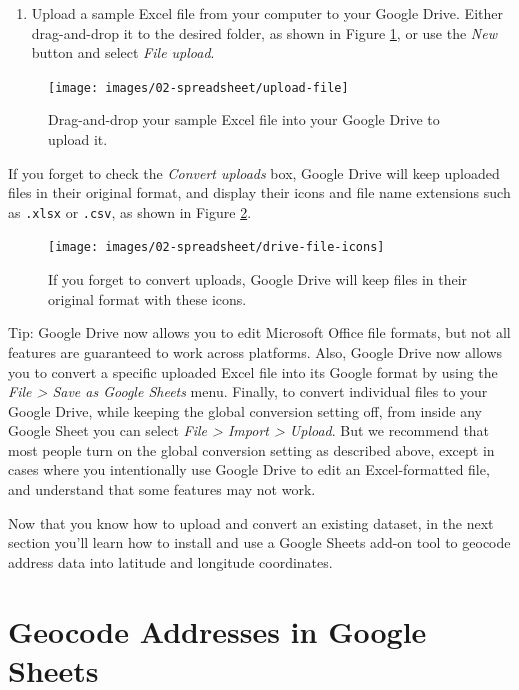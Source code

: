 \documentclass[
  english,
]{book}
\providecommand{\tightlist}{%
  \setlength{\itemsep}{0pt}\setlength{\parskip}{0pt}}
\begin{document}
\begin{enumerate}
\def\labelenumi{\arabic{enumi}.}
\setcounter{enumi}{3}
\tightlist
\item
  Upload a sample Excel file from your computer to your Google Drive. Either drag-and-drop it to the desired folder, as shown in Figure \ref{fig:upload-file}, or use the \emph{New} button and select \emph{File upload}.
\end{enumerate}



\begin{figure}
\texttt{[image: images/02-spreadsheet/upload-file]} \caption{Drag-and-drop your sample Excel file into your Google Drive to upload it.}\label{fig:upload-file}
\end{figure}

If you forget to check the \emph{Convert uploads} box, Google Drive will keep uploaded files in their original format, and display their icons and file name extensions such as \texttt{.xlsx} or \texttt{.csv}, as shown in Figure \ref{fig:drive-file-icons}.



\begin{figure}
\texttt{[image: images/02-spreadsheet/drive-file-icons]} \caption{If you forget to convert uploads, Google Drive will keep files in their original format with these icons.}\label{fig:drive-file-icons}
\end{figure}

Tip: Google Drive now allows you to edit Microsoft Office file formats, but not all features are guaranteed to work across platforms. Also, Google Drive now allows you to convert a specific uploaded Excel file into its Google format by using the \emph{File \textgreater{} Save as Google Sheets} menu. Finally, to convert individual files to your Google Drive, while keeping the global conversion setting off, from inside any Google Sheet you can select \emph{File \textgreater{} Import \textgreater{} Upload}. But we recommend that most people turn on the global conversion setting as described above, except in cases where you intentionally use Google Drive to edit an Excel-formatted file, and understand that some features may not work.

Now that you know how to upload and convert an existing dataset, in the next section you'll learn how to install and use a Google Sheets add-on tool to geocode address data into latitude and longitude coordinates.

\hypertarget{geocode}{%
\section*{Geocode Addresses in Google Sheets}\label{geocode}}
\end{document}
